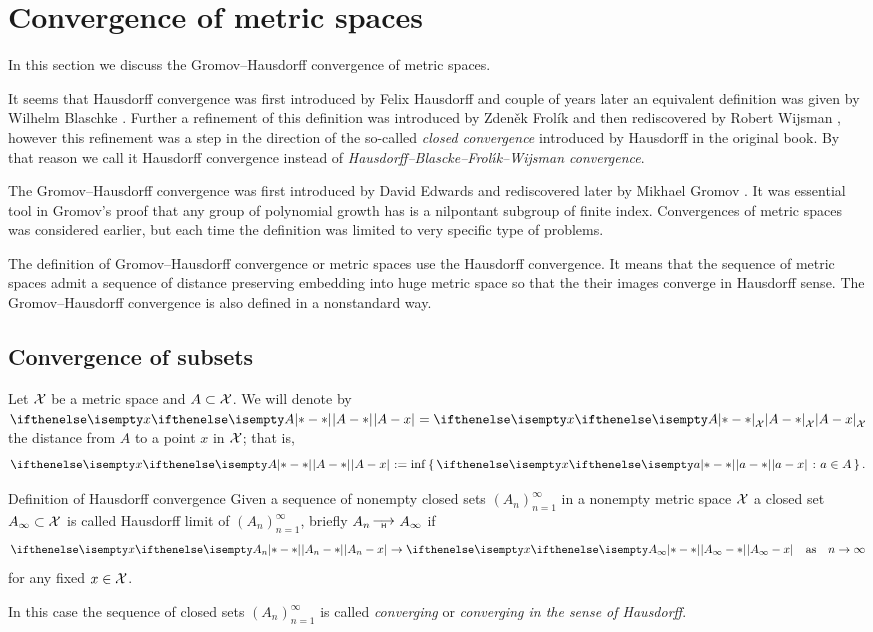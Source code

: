 \chapter{Convergence of metric spaces}

In this section we discuss the
Gromov--Hausdorff convergence of metric spaces.

It seems that Hausdorff convergence was first introduced by Felix Hausdorff \cite{hausdorff}
and couple of years later an equivalent definition was given by Wilhelm Blaschke \cite{blaschke}.
Further a refinement of this definition was introduced by Zdeněk Frolík \cite{frolik}
and then rediscovered by Robert Wijsman \cite{wijsman},
however this refinement was a step in the direction of the so-called \emph{closed convergence} introduced by Hausdorff in the original book. 
By that reason we call it Hausdorff convergence
instead of
\emph{Hausdorff--Blascke--Frol\'{\i}k--Wijsman convergence}.

The Gromov--Hausdorff convergence was first introduced by David Edwards \cite{edwards}
and rediscovered later by Mikhael Gromov \cite{gromov-polynomial-growth}.
It was essential tool in Gromov's proof that any group of polynomial growth has is a nilpontant subgroup of finite index.
Convergences of metric spaces
was considered earlier, but each time
the definition was limited to very specific type of problems.

The definition of Gromov--Hausdorff convergence or metric spaces use 
the Hausdorff convergence.
It means that the sequence of metric spaces admit a sequence of distance preserving embedding into huge metric space so that the their
images converge in Hausdorff sense.
The Gromov--Hausdorff convergence is also defined in a nonstandard way.


\section{Convergence of subsets}


Let $\mathcal{X}$ be a metric space and $A\subset \spc{X}$.
We will denote by $\dist{A}{x}{}=\dist{A}{x}{\spc{X}}$ the distance from $A$ to a point $x$ in $\mathcal{X}$;
that is,
$$\dist{A}{x}{}\df\inf\set{\dist{a}{x}{}}{a\in A}.$$

\begin{thm}{Definition of Hausdorff convergence}\label{def:hausdorff-coverge}
Given a sequence of nonempty closed sets $(A_n)_{n=1}^\infty$ in a nonempty metric space $\mathcal{X}$ 
a closed set $A_\infty\subset \spc{X}$ is called Hausdorff limit of $(A_n)_{n=1}^\infty$,
briefly $A_n\Hto A_\infty$ if 
$$\dist{A_n}{x}{}\to\dist{A_\infty}{x}{}\quad \text{as}\quad n\to\infty$$
for any fixed $x\in \spc{X}$.

In this case the sequence of closed sets $(A_n)_{n=1}^\infty$ is called \emph{converging} or \emph{converging in the sense of Hausdorff}.
\end{thm}

